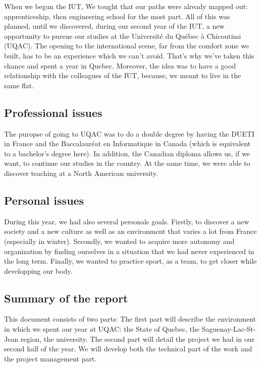 When we begun the IUT, We tought that our paths were already mapped out: apprenticeship, then engineering school for the most part. All of this was planned, until we discovered, during our second year of the IUT, a new opportunity to pursue our studies at the Université du Québec à Chicoutimi (UQAC). The opening to the international scene, far from the comfort zone we built, has to be an experience which we can't avoid. That's why we've taken this chance and spent a year in Quebec. Moreover, the idea was to have a good relationship with the colleagues of the IUT, because, we meant to live in the same flat.

\subsection{Professional issues}

The puropse of going to UQAC was to do a double degree by having the DUETI in France and the Baccalauréat en Informatique in Canada (which is equivalent to a bachelor's degree here). In addition, the Canadian diploma allows us, if we want, to continue our studies in the country. At the same time, we were able to discover teaching at a North American university.

\subsection{Personal issues}

During this year, we had also several personals goals.
Firstly, to discover a new society and a new culture as well as an environment that varies a lot from France (especially in winter). 
Secondly, we wanted to acquire more autonomy and organization by finding ourselves in a situation that we had never experienced in the long term.
Finally, we wanted to practice sport, as a team, to get closer while developping our body.

\subsection{Summary of the report}

This document consists of two parts:\newline
The first part will describe the environment in which we spent our year at UQAC: the State of Quebec, the Saguenay-Lac-St-Jean region, the university.\newline
The second part will detail the project we had in our second half of the year. We will develop both the technical part of the work and the project management part.

